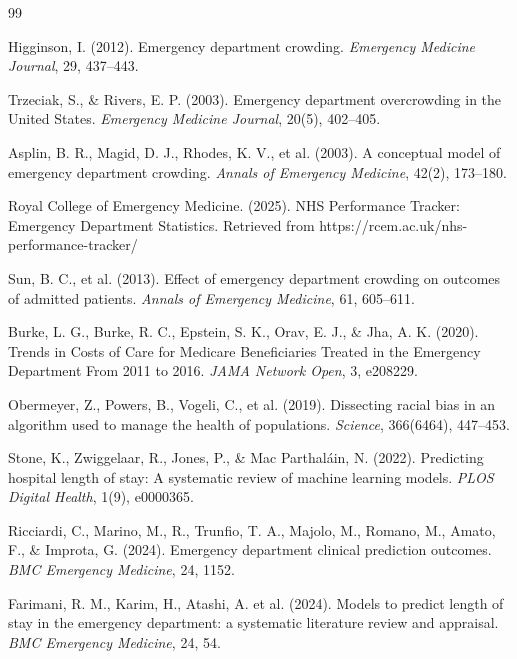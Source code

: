 \documentclass[harvard,article]{frontiersinFPHY_FAMS}
\begin{document}
\begin{thebibliography}{99}

 Higginson, I. (2012). Emergency department crowding. \textit{Emergency Medicine Journal}, 29, 437--443.

 Trzeciak, S., \& Rivers, E. P. (2003). Emergency department overcrowding in the United States. \textit{Emergency Medicine Journal}, 20(5), 402--405.

 Asplin, B. R., Magid, D. J., Rhodes, K. V., et al. (2003). A conceptual model of emergency department crowding. \textit{Annals of Emergency Medicine}, 42(2), 173--180.

 Royal College of Emergency Medicine. (2025). NHS Performance Tracker: Emergency Department Statistics. Retrieved from https://rcem.ac.uk/nhs-performance-tracker/

 Sun, B. C., et al. (2013). Effect of emergency department crowding on outcomes of admitted patients. \textit{Annals of Emergency Medicine}, 61, 605--611.

 Burke, L. G., Burke, R. C., Epstein, S. K., Orav, E. J., \& Jha, A. K. (2020). Trends in Costs of Care for Medicare Beneficiaries Treated in the Emergency Department From 2011 to 2016. \textit{JAMA Network Open}, 3, e208229.

 Obermeyer, Z., Powers, B., Vogeli, C., et al. (2019). Dissecting racial bias in an algorithm used to manage the health of populations. \textit{Science}, 366(6464), 447--453.

 Stone, K., Zwiggelaar, R., Jones, P., \& Mac Parthaláin, N. (2022). Predicting hospital length of stay: A systematic review of machine learning models. \textit{PLOS Digital Health}, 1(9), e0000365.

 Ricciardi, C., Marino, M., R., Trunfio, T. A., Majolo, M., Romano, M., Amato, F., \& Improta, G. (2024). Emergency department clinical prediction outcomes. \textit{BMC Emergency Medicine}, 24, 1152.

 Farimani, R. M., Karim, H., Atashi, A. et al. (2024). Models to predict length of stay in the emergency department: a systematic literature review and appraisal. \textit{BMC Emergency Medicine}, 24, 54.


\end{thebibliography}
\end{document}
